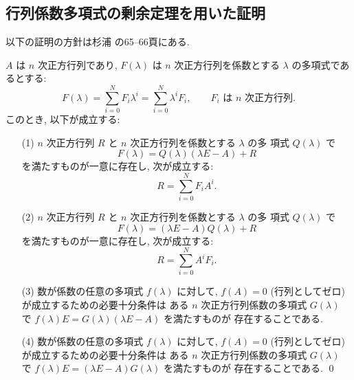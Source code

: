 \documentclass[12pt,twoside]{jarticle}
\begin{document}

\subsection{行列係数多項式の剰余定理を用いた証明}
\label{sec:CH-remainder}


以下の証明の方針は杉浦 \cite{sugiura} の65--66頁にある.  

\begin{question}[行列係数多項式の剰余定理, 20点]
\label{q:matrix-remainder-theorem}
  $A$ は $n$ 次正方行列であり, 
  $F(\lambda)$ は $n$ 次正方行列を係数とする $\lambda$ の多項式であるとする:
  \begin{equation*}
    F(\lambda) = \sum_{i=0}^N F_i \lambda^i = \sum_{i=0}^N \lambda^i F_i,
    \qquad \text{$F_i$ は $n$ 次正方行列}.
  \end{equation*}
  このとき, 以下が成立する:
  \begin{enumerate}
  \item[(1)] $n$ 次正方行列 $R$ と $n$ 次正方行列を係数とする $\lambda$ の多 
    項式 $Q(\lambda)$ で
    \begin{equation*}
      F(\lambda) = Q(\lambda)(\lambda E - A) + R
    \end{equation*}
    を満たすものが一意に存在し, 次が成立する:
    \begin{equation*}
      R = \sum_{i=0}^N F_i A^i.
    \end{equation*}
  \item[(2)] $n$ 次正方行列 $R$ と $n$ 次正方行列を係数とする $\lambda$ の多 
    項式 $Q(\lambda)$ で
    \begin{equation*}
      F(\lambda) = (\lambda E - A)Q(\lambda) + R
    \end{equation*}
    を満たすものが一意に存在し, 次が成立する:
    \begin{equation*}
      R = \sum_{i=0}^N A^i F_i.
    \end{equation*}
  \item[(3)] 数が係数の任意の多項式 $f(\lambda)$ に対して, 
    $f(A)=0$ (行列としてゼロ) が成立するための必要十分条件は
    ある $n$ 次正方行列係数の多項式 $G(\lambda)$ 
    で $f(\lambda)E = G(\lambda)(\lambda E - A)$ を満たすものが
    存在することである.
  \item[(4)] 数が係数の任意の多項式 $f(\lambda)$ に対して, 
    $f(A)=0$ (行列としてゼロ) が成立するための必要十分条件は
    ある $n$ 次正方行列係数の多項式 $G(\lambda)$ 
    で $f(\lambda)E = (\lambda E - A)G(\lambda)$ を満たすものが
    存在することである.
    \qed
  \end{enumerate}
\end{question}
\end{document}
